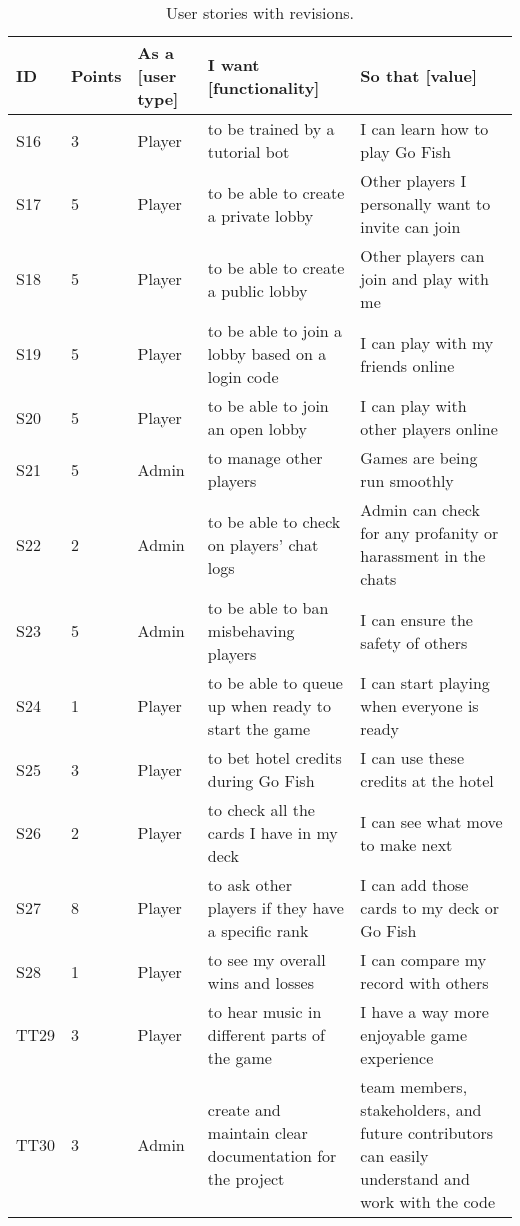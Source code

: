 \pagebreak
\begin{table}[h!]
\centering
\small
\begin{tabularx}{\textwidth}{|l|l|p{1cm}|X|X|}
\hline
\textbf{ID} & \textbf{Points} & \textbf{As a [user type]} & \textbf{I want [functionality]} & \textbf{So that [value]} \\ \hline
S16 & 3 & Player & to be trained by a tutorial bot & I can learn how to play Go Fish \\ \hline
S17 & 5 & Player & to be able to create a private lobby & Other players I personally want to invite can join \\ \hline
S18 & 5 & Player & to be able to create a public lobby & Other players can join and play with me \\ \hline
S19 & 5 & Player & to be able to join a lobby based on a login code & I can play with my friends online \\ \hline
S20 & 5 & Player & to be able to join an open lobby & I can play with other players online \\ \hline
S21 & 5 & Admin & to manage other players & Games are being run smoothly \\ \hline
S22 & 2 & Admin & to be able to check on players' chat logs & Admin can check for any profanity or harassment in the chats \\ \hline
S23 & 5 & Admin & to be able to ban misbehaving players & I can ensure the safety of others \\ \hline
S24 & 1 & Player & to be able to queue up when ready to start the game & I can start playing when everyone is ready \\ \hline
S25 & 3 & Player & to bet hotel credits during Go Fish & I can use these credits at the hotel \\ \hline
S26 & 2 & Player & to check all the cards I have in my deck & I can see what move to make next \\ \hline
S27 & 8 & Player & to ask other players if they have a specific rank & I can add those cards to my deck or Go Fish \\ \hline
S28 & 1 & Player & to see my overall wins and losses & I can compare my record with others \\ \hline
\rowcolor{cyan!25}
TT29 & 3 & Player & to hear music in different parts of the game & I have a way more enjoyable game experience \\ \hline
\rowcolor{cyan!25 }
TT30 & 3 & Admin & create and maintain clear documentation for the project & team members, stakeholders, and future contributors can easily understand and work with the code\\ \hline
\end{tabularx}
\caption{User stories with revisions.}
\end{table}